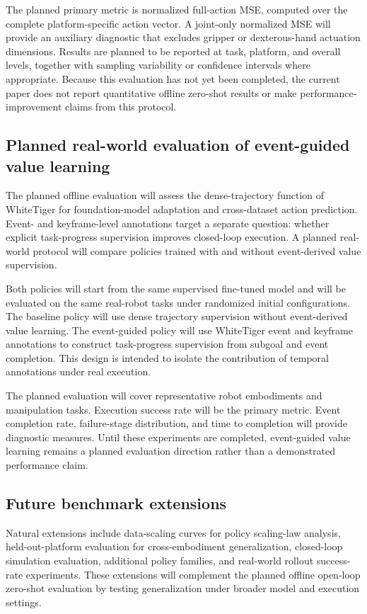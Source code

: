 The planned primary metric is normalized full-action MSE, computed over the complete platform-specific action vector. A joint-only normalized MSE will provide an auxiliary diagnostic that excludes gripper or dexterous-hand actuation dimensions. Results are planned to be reported at task, platform, and overall levels, together with sampling variability or confidence intervals where appropriate. Because this evaluation has not yet been completed, the current paper does not report quantitative offline zero-shot results or make performance-improvement claims from this protocol.

\subsection{Planned real-world evaluation of event-guided value learning}

The planned offline evaluation will assess the dense-trajectory function of WhiteTiger for foundation-model adaptation and cross-dataset action prediction. Event- and keyframe-level annotations target a separate question: whether explicit task-progress supervision improves closed-loop execution. A planned real-world protocol will compare policies trained with and without event-derived value supervision.

Both policies will start from the same supervised fine-tuned model and will be evaluated on the same real-robot tasks under randomized initial configurations. The baseline policy will use dense trajectory supervision without event-derived value learning. The event-guided policy will use WhiteTiger event and keyframe annotations to construct task-progress supervision from subgoal and event completion. This design is intended to isolate the contribution of temporal annotations under real execution.

The planned evaluation will cover representative robot embodiments and manipulation tasks. Execution success rate will be the primary metric. Event completion rate, failure-stage distribution, and time to completion will provide diagnostic measures. Until these experiments are completed, event-guided value learning remains a planned evaluation direction rather than a demonstrated performance claim.

\subsection{Future benchmark extensions}

Natural extensions include data-scaling curves for policy scaling-law analysis, held-out-platform evaluation for cross-embodiment generalization, closed-loop simulation evaluation, additional policy families, and real-world rollout success-rate experiments. These extensions will complement the planned offline open-loop zero-shot evaluation by testing generalization under broader model and execution settings.
